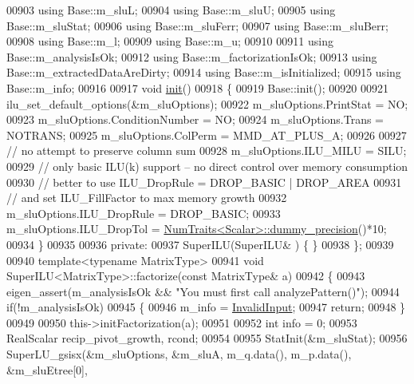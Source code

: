 \begin{DoxyCode}
00903     \textcolor{keyword}{using} Base::m\_sluL;
00904     \textcolor{keyword}{using} Base::m\_sluU;
00905     \textcolor{keyword}{using} Base::m\_sluStat;
00906     \textcolor{keyword}{using} Base::m\_sluFerr;
00907     \textcolor{keyword}{using} Base::m\_sluBerr;
00908     \textcolor{keyword}{using} Base::m\_l;
00909     \textcolor{keyword}{using} Base::m\_u;
00910     
00911     \textcolor{keyword}{using} Base::m\_analysisIsOk;
00912     \textcolor{keyword}{using} Base::m\_factorizationIsOk;
00913     \textcolor{keyword}{using} Base::m\_extractedDataAreDirty;
00914     \textcolor{keyword}{using} Base::m\_isInitialized;
00915     \textcolor{keyword}{using} Base::m\_info;
00916 
00917     \textcolor{keywordtype}{void} \hyperlink{structinit}{init}()
00918     \{
00919       Base::init();
00920       
00921       ilu\_set\_default\_options(&m\_sluOptions);
00922       m\_sluOptions.PrintStat        = NO;
00923       m\_sluOptions.ConditionNumber  = NO;
00924       m\_sluOptions.Trans            = NOTRANS;
00925       m\_sluOptions.ColPerm          = MMD\_AT\_PLUS\_A;
00926       
00927       \textcolor{comment}{// no attempt to preserve column sum}
00928       m\_sluOptions.ILU\_MILU = SILU;
00929       \textcolor{comment}{// only basic ILU(k) support -- no direct control over memory consumption}
00930       \textcolor{comment}{// better to use ILU\_DropRule = DROP\_BASIC | DROP\_AREA}
00931       \textcolor{comment}{// and set ILU\_FillFactor to max memory growth}
00932       m\_sluOptions.ILU\_DropRule = DROP\_BASIC;
00933       m\_sluOptions.ILU\_DropTol = \hyperlink{group___core___module_struct_eigen_1_1_num_traits}{NumTraits<Scalar>::dummy\_precision}()*10;
00934     \}
00935     
00936   \textcolor{keyword}{private}:
00937     SuperILU(SuperILU& ) \{ \}
00938 \};
00939 
00940 \textcolor{keyword}{template}<\textcolor{keyword}{typename} MatrixType>
00941 \textcolor{keywordtype}{void} SuperILU<MatrixType>::factorize(\textcolor{keyword}{const} MatrixType& a)
00942 \{
00943   eigen\_assert(m\_analysisIsOk && \textcolor{stringliteral}{"You must first call analyzePattern()"});
00944   \textcolor{keywordflow}{if}(!m\_analysisIsOk)
00945   \{
00946     m\_info = \hyperlink{group__enums_gga85fad7b87587764e5cf6b513a9e0ee5ea945604f62795ffc70aedf2bd12ea0434}{InvalidInput};
00947     \textcolor{keywordflow}{return};
00948   \}
00949   
00950   this->initFactorization(a);
00951 
00952   \textcolor{keywordtype}{int} info = 0;
00953   RealScalar recip\_pivot\_growth, rcond;
00954 
00955   StatInit(&m\_sluStat);
00956   SuperLU\_gsisx(&m\_sluOptions, &m\_sluA, m\_q.data(), m\_p.data(), &m\_sluEtree[0],

\end{DoxyCode}
